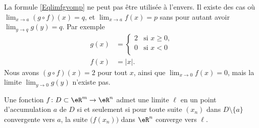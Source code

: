 \begin{remark}
	La formule \eqref{Eqlimfgvomp} ne peut pas être utilisée à l'envers. Il existe des cas où $\lim_{x\to a} (g\circ f)(x)=q$, et $\lim_{x\to a} f(x)=p$ sans pour autant avoir $\lim_{y\to q} g(y)=q$. Par exemple
	\begin{subequations}
		\begin{align}
			g(x)&=\begin{cases}
				2	&	\text{si $x\geq0$,}\\
				0	&	 \text{si $x<0$}\\
			\end{cases}\\
			f(x)&=| x |.
		\end{align}
	\end{subequations}
	Nous avons $(g\circ f)(x)=2$ pour tout $x$, ainsi que $\lim_{x\to 0} f(x)=0$, mais la limite $\lim_{y\to 0} g(y)$ n'existe pas.
\end{remark}


\begin{theorem}		\label{ThoLimSuite}
	Une fonction $f\colon D\subset\eR^m\to \eR^n$ admet une limite $\ell$ en un point d'accumulation $a$ de $D$ si et seulement si pour toute suite $(x_n)$ dans $D\setminus\{ a \}$ convergente vers $a$, la suite $\big( f(x_n) \big)$ dans $\eR^n$ converge vers $\ell$.
\end{theorem}

